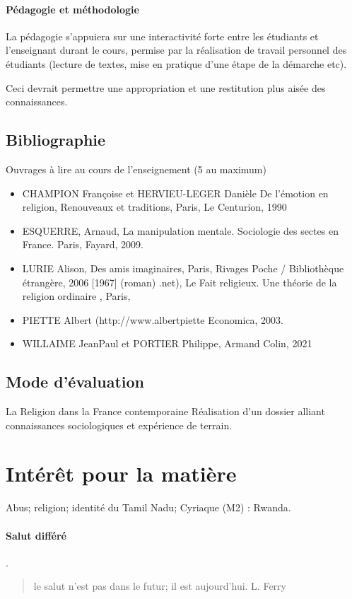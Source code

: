 \paragraph{Pédagogie et méthodologie	}
 La pédagogie s’appuiera sur une interactivité forte entre les étudiants et l’enseignant durant le cours, permise par la réalisation de travail personnel des étudiants (lecture de textes, mise en pratique d’une étape de la démarche etc). 

Ceci devrait permettre une appropriation et une restitution plus aisée des connaissances.  

\subsection{Bibliographie }
Ouvrages à lire au cours de l’enseignement (5 au maximum)  
\begin{itemize}
\item 
CHAMPION Françoise et HERVIEU-LEGER Danièle De l’émotion en religion, Renouveaux  et traditions, Paris, Le Centurion, 1990 
\item ESQUERRE, Arnaud, La manipulation mentale. Sociologie des sectes en France. Paris, Fayard, 2009. 
\item LURIE Alison, Des amis imaginaires, Paris,  Rivages Poche / Bibliothèque étrangère,  2006 [1967] (roman) .net), Le Fait religieux. Une théorie de la religion ordinaire , Paris, 
\item PIETTE Albert (http://www.albertpiette Economica, 2003. 
\item WILLAIME JeanPaul et PORTIER Philippe, Armand Colin, 2021 
\end{itemize}

\subsection{Mode d’évaluation }
La Religion dans la France contemporaine 
Réalisation d’un dossier alliant connaissances sociologiques et expérience de terrain. 


\section{Intérêt pour la matière}

Abus; religion; identité du Tamil Nadu; 
Cyriaque (M2) : Rwanda.

\paragraph{Salut différé} .
\begin{quote}
    le salut n'est pas dans le futur; il est aujourd'hui. L. Ferry
\end{quote}
